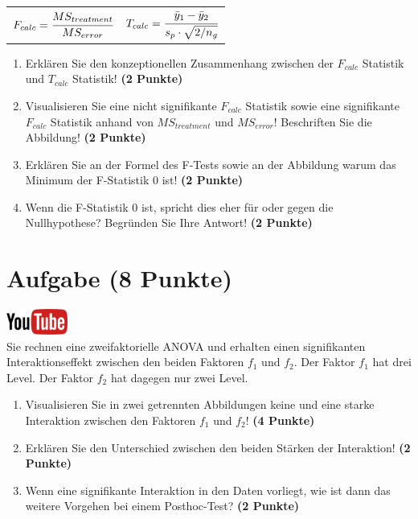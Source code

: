 \documentclass[a4paper, 9pt]{scrartcl}\usepackage[]{graphicx}\usepackage[]{xcolor}
\begin{document}
\begin{center}
  \begin{tabular}{cc}
    $F_{calc} = \cfrac{MS_{treatment}}{MS_{error}}$ & $T_{calc} = \cfrac{\bar{y}_1 - \bar{y}_2}{s_p \cdot \sqrt{2/n_g}}$\\
  \end{tabular}
\end{center}


\begin{enumerate}
\item Erkl{\"a}ren Sie den konzeptionellen Zusammenhang zwischen der $F_{calc}$
  Statistik und $T_{calc}$ Statistik! \textbf{(2 Punkte)}
\item Visualisieren Sie eine nicht signifikante $F_{calc}$ Statistik sowie
  eine signifikante $F_{calc}$ Statistik anhand von $MS_{treatment}$ und
  $MS_{error}$! Beschriften Sie die Abbildung! \textbf{(2 Punkte)}
\item Erkl{\"a}ren Sie an der Formel des F-Tests sowie an der Abbildung warum
  das Minimum der F-Statistik 0 ist! \textbf{(2 Punkte)}
\item Wenn die F-Statistik 0 ist, spricht dies eher f{\"u}r oder gegen die
  Nullhypothese? Begr{\"u}nden Sie Ihre Antwort! \textbf{(2 Punkte)}
\end{enumerate}

 
\clearpage

\section{Aufgabe \hfill (8 Punkte)}

\hfill\href{https://youtu.be/2qG1Dws0MJo}{\includegraphics[width =
  2cm]{img/youtube}}\\[1Ex]


Sie rechnen eine zweifaktorielle ANOVA und erhalten einen signifikanten
Interaktionseffekt zwischen den beiden Faktoren $f_1$ und $f_2$. Der Faktor
$f_1$ hat drei Level. Der Faktor $f_2$ hat dagegen nur zwei Level.




\begin{enumerate}
\item Visualisieren Sie in zwei getrennten Abbildungen 
  keine und eine starke Interaktion zwischen
  den Faktoren $f_1$ und $f_2$! \textbf{(4 Punkte)}
\item Erkl{\"a}ren Sie den Unterschied zwischen den beiden St{\"a}rken der Interaktion!
  \textbf{(2 Punkte)}
\item Wenn eine signifikante Interaktion in den Daten vorliegt, wie ist
  dann das weitere Vorgehen bei einem Posthoc-Test? 
  \textbf{(2 Punkte)}
\end{enumerate}
\end{document}
